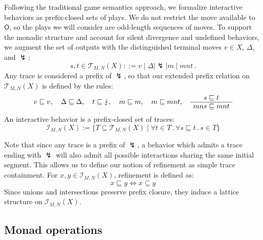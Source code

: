 \documentclass{article}
\newcommand{\kw}[1]{\ensuremath{ \mathsf{#1} }}
\begin{document}
Following the traditional game semantics approach,
we formalize interactive behaviors as prefix-closed sets of plays.
We do not restrict the move available to $\kw{O}$,
so the plays we will consider are odd-length sequences of moves.
To support the monadic structure and account
for silent divergence and undefined behaviors,
we augment the set of outputs with the
distinguished terminal moves $v \in X$, $\Delta$, and $\lightning$:
\[
    s, t \in
    \mathcal{T}_{M,N}(X) ::=
    v \mid \Delta \mid \lightning \mid m \mid mnt \,.
\]
Any trace is considered a prefix of $\lightning$,
so that our extended prefix relation on $\mathcal{T}_{M,N}(X)$
is defined by the rules:
\begin{gather*}
  v \sqsubseteq v , \quad
  \Delta \sqsubseteq \Delta , \quad
  t \sqsubseteq \lightning , \quad
  m \sqsubseteq m , \quad
  m \sqsubseteq mnt ,
  \quad
  \AxiomC{$s \sqsubseteq t$}
  \UnaryInfC{$mns \sqsubseteq mnt$}
  \DisplayProof
\end{gather*}
An interactive behavior is
a prefix-closed set of traces:
\[
    \mathcal{I}_{M,N}(X) :=
    \{ T \subseteq \mathcal{T}_{M,N}(X) \mid
       \forall t \in T \,.\, \forall s \sqsubseteq t \,.\, s \in T \}
\]

Note that since any trace is a prefix of $\lightning$,
a behavior which admits a trace ending with $\lightning$
will also admit all possible interactions
sharing the same initial segment. 
This allows us to define our notion of refinement
as simple trace containment.
For $x, y \in \mathcal{I}_{M,N}(X)$, refinement is defined as:
\[
    x \sqsubseteq y \Leftrightarrow x \subseteq y
\]
Since unions and intersections
preserve prefix closure,
they induce a lattice structure on $\mathcal{I}_{M,N}(X)$.


\subsection{Monad operations} %
\end{document}
